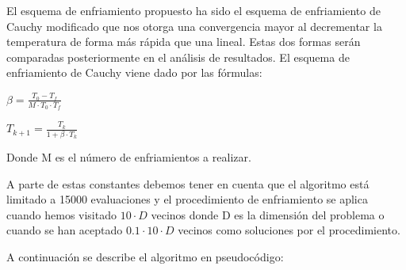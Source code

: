 \documentclass[12pt,a4paper]{article}
\begin{document}
	El esquema de enfriamiento propuesto ha sido el esquema de enfriamiento de Cauchy modificado que nos otorga una convergencia mayor al decrementar la temperatura de forma más rápida que una lineal. Estas dos formas serán comparadas posteriormente en el análisis de resultados. El esquema de enfriamiento de Cauchy viene dado por las fórmulas:
	
	\vspace{10px}
	
	$\beta = \frac{T_0 - T_f}{M\cdot T_0\cdot T_f}$
	
	\vspace{10px}
	
	$T_{k+1} = \frac{T_k}{1+\beta \cdot T_k}$
	
	\vspace{10px}
	
	Donde M es el número de enfriamientos a realizar.
	
	A parte de estas constantes debemos tener en cuenta que el algoritmo está limitado a 15000 evaluaciones y el procedimiento de enfriamiento se aplica cuando hemos visitado $10\cdot D$ vecinos donde D es la dimensión del problema o cuando se han aceptado $0.1\cdot 10\cdot D$ vecinos como soluciones por el procedimiento.
	
	A continuación se describe el algoritmo en pseudocódigo: 
	
\end{document}
